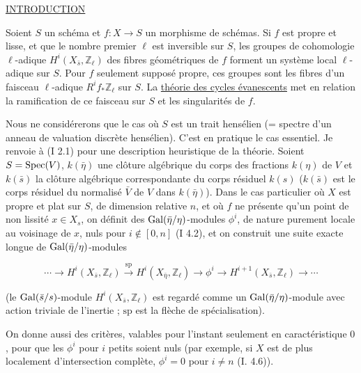 
\thispagestyle{empty}
\begin{center}
\underline{INTRODUCTION}
\end{center}

Soient $S$ un schéma et $f:X\longrightarrow S$ un morphisme de schémas. Si $f$ est
propre et lisse, et que le nombre premier $\ell$ est inversible sur $S$, les groupes de
cohomologie $\ell$-adique $H^i(X_{\bar s},\mathbb Z_\ell)$ des fibres géométriques de $f$ forment un système
local $\ell$-adique sur $S$. Pour $f$ seulement supposé propre, ces groupes sont les fibres
d'un faisceau $\ell$-adique $R^i f_*\mathbb Z_\ell$ sur $S$. La \underline{théorie des cycles évanescents} met
en relation la ramification de ce faisceau sur $S$ et les singularités de $f$.

Nous ne considérerons que le cas où $S$ est un trait hensélien (= spectre d'un
anneau de valuation discrète hensélien). C'est en pratique le cas essentiel. Je renvoie
à (I 2.1) pour une description heuristique de la théorie. Soient $S=\operatorname{Spec}(V)$, $k(\bar\eta)$
une clôture algébrique du corps des fractions $k(\eta)$ de $V$ et $k(\bar s)$ la clôture algébrique
correspondante du corps résiduel $k(s)$ ($k(\bar s)$ est le corps résiduel du normalisé
$\bar V$ de $V$ dans $k(\bar\eta)$). Dans le cas particulier où $X$ est propre et plat sur
$S$, de dimension relative $n$, et où $f$ ne présente qu'un point de non lissité
$x\in X_s$, on définit des $\operatorname{Gal}(\bar\eta/\eta)$-modules $\phi^i$, de nature purement locale au voisinage
de $x$, nuls pour $i\notin[0,n]$ (I 4.2), et on construit une suite exacte longue
de $\operatorname{Gal}(\bar\eta/\eta)$-modules

\[
\cdots \longrightarrow H^i(X_{\bar s},\mathbb Z_\ell)
\xrightarrow{\mathrm{sp}} H^i(X_{\bar\eta},\mathbb Z_\ell)
\longrightarrow \phi^i
\longrightarrow H^{i+1}(X_{\bar s},\mathbb Z_\ell)
\longrightarrow \cdots
\]

(le $\operatorname{Gal}(\bar s/s)$-module $H^i(X_{\bar s},\mathbb Z_\ell)$ est regardé comme un
$\operatorname{Gal}(\bar\eta/\eta)$-module avec action triviale de l'inertie ; $\mathrm{sp}$ est la flèche de spécialisation).

On donne aussi des critères, valables pour l'instant seulement en caractéristique
$0$, pour que les $\phi^i$ pour $i$ petits soient nuls (par exemple, si $X$ est de plus
localement d'intersection complète, $\phi^i=0$ pour $i\ne n$ (I. 4.6)).

